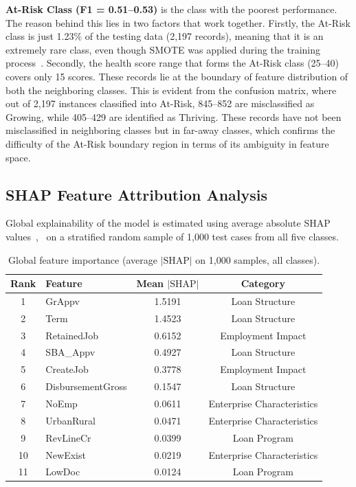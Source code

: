 \textbf{At-Risk Class (F1 = 0.51--0.53)} is the class with the poorest performance. The reason behind this lies in two factors that work together. Firstly, the At-Risk class is just 1.23\% of the testing data (2,197 records), meaning that it is an extremely rare class, even though SMOTE was applied during the training process~\cite{12}. Secondly, the health score range that forms the At-Risk class (25--40) covers only 15 scores. These records lie at the boundary of feature distribution of both the neighboring classes. This is evident from the confusion matrix, where out of 2,197 instances classified into At-Risk, 845--852 are misclassified as Growing, while 405--429 are identified as Thriving. These records have not been misclassified in neighboring classes but in far-away classes, which confirms the difficulty of the At-Risk boundary region in terms of its ambiguity in feature space.

\subsection{SHAP Feature Attribution Analysis}

Global explainability of the model is estimated using average absolute SHAP values~\cite{17},~\cite{18} on a stratified random sample of 1,000 test cases from all five classes.

\begin{table}[htbp]
\centering
\caption{Global feature importance (average $|\text{SHAP}|$ on 1,000 samples, all classes).}
\label{tab:shap_global}
\begin{tabular}{clcc}
\hline
\textbf{Rank} & \textbf{Feature} & \textbf{Mean $|\text{SHAP}|$} & \textbf{Category} \\
\hline
1 & GrAppv & 1.5191 & Loan Structure \\
2 & Term & 1.4523 & Loan Structure \\
3 & RetainedJob & 0.6152 & Employment Impact \\
4 & SBA\_Appv & 0.4927 & Loan Structure \\
5 & CreateJob & 0.3778 & Employment Impact \\
6 & DisbursementGross & 0.1547 & Loan Structure \\
7 & NoEmp & 0.0611 & Enterprise Characteristics \\
8 & UrbanRural & 0.0471 & Enterprise Characteristics \\
9 & RevLineCr & 0.0399 & Loan Program \\
10 & NewExist & 0.0219 & Enterprise Characteristics \\
11 & LowDoc & 0.0124 & Loan Program \\
\hline
\end{tabular}
\end{table}

